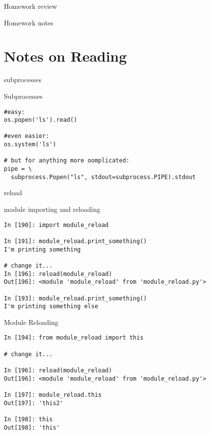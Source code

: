 \documentclass{beamer}
\begin{document}
\begin{frame}{Homework review}

  {\Large Homework notes }

\end{frame}

\section {Notes on Reading}

\begin{frame}[fragile]{subprocesses}

{\Large Subprocesses}
\begin{verbatim}
#easy:  
os.popen('ls').read()

#even easier:
os.system('ls')

# but for anything more oomplicated:
pipe = \
  subprocess.Popen("ls", stdout=subprocess.PIPE).stdout 
\end{verbatim}

\end{frame}


\begin{frame}[fragile]{reload}

{\Large module importing and reloading}
\begin{verbatim}
In [190]: import module_reload

In [191]: module_reload.print_something()
I'm printing something

# change it...
In [196]: reload(module_reload)
Out[196]: <module 'module_reload' from 'module_reload.py'>

In [193]: module_reload.print_something()
I'm printing something else
\end{verbatim}

\end{frame}

\begin{frame}[fragile]{Module Reloading}

\begin{verbatim}
In [194]: from module_reload import this

# change it...

In [196]: reload(module_reload)
Out[196]: <module 'module_reload' from 'module_reload.py'>

In [197]: module_reload.this
Out[197]: 'this2'

In [198]: this
Out[198]: 'this'
\end{verbatim}

\end{frame}
\end{document}
